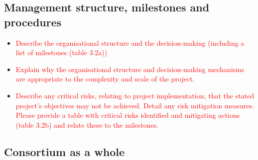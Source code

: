 \documentclass[12pt, a4paper]{article} %
\begin{document}

  
  \subsection{Management structure, milestones and procedures}
  \begin{itemize}
  \item \textcolor{red}{Describe the organisational structure and the
      decision-making (including a list of milestones (table 3.2a))}
\item \textcolor{red}{Explain why the organisational structure and
  decision-making mechanisms are appropriate to the complexity and
  scale of the project.}
\item \textcolor{red}{Describe any critical risks, relating to project
    implementation, that the stated project's objectives may not be
    achieved. Detail any risk mitigation measures. Please provide a
    table with critical risks identified and mitigating actions (table
    3.2b) and relate these to the milestones.}
  \end{itemize}

  \subsection{Consortium as a whole}
\end{document}
